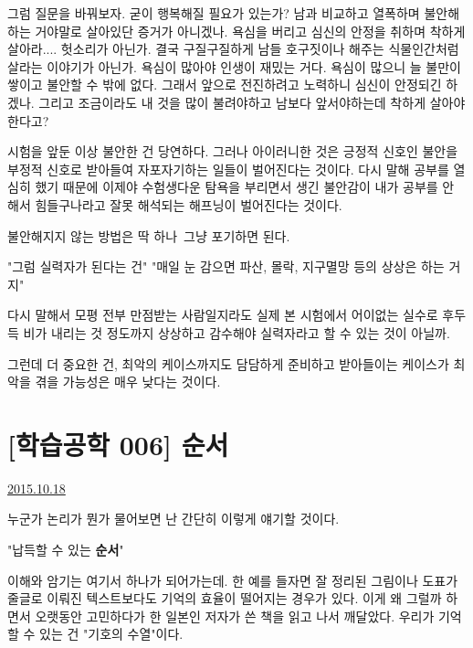 그럼 질문을 바꿔보자. 굳이 행복해질 필요가 있는가?
남과 비교하고 열폭하며 불안해하는 거야말로 살아있단 증거가 아니겠나.
욕심을 버리고 심신의 안정을 취하며 착하게 살아라.... 헛소리가 아닌가.
결국 구질구질하게 남들 호구짓이나 해주는 식물인간처럼 살라는 이야기가 아닌가.
욕심이 많아야 인생이 재밌는 거다. 욕심이 많으니 늘 불만이 쌓이고 불안할 수 밖에 없다.
그래서 앞으로 전진하려고 노력하니 심신이 안정되긴 하겠나.
그리고 조금이라도 내 것을 많이 불려야하고 남보다 앞서야하는데 착하게 살아야한다고?
\vspace{5mm}

시험을 앞둔 이상 불안한 건 당연하다. 그러나 아이러니한 것은
긍정적 신호인 불안을 부정적 신호로 받아들여 자포자기하는 일들이 벌어진다는 것이다.
다시 말해 공부를 열심히 했기 때문에 이제야 수험생다운 탐욕을 부리면서 생긴 불안감이
내가 공부를 안 해서 힘들구나라고 잘못 해석되는 해프닝이 벌어진다는 것이다.
\vspace{5mm}

불안해지지 않는 방법은 딱 하나 그냥 포기하면 된다.
\vspace{5mm}

"그럼 실력자가 된다는 건"
"매일 눈 감으면 파산, 몰락, 지구멸망 등의 상상은 하는 거지"
\vspace{5mm}

다시 말해서 모평 전부 만점받는 사람일지라도
실제 본 시험에서 어이없는 실수로 후두득 비가 내리는 것 정도까지 상상하고 감수해야
실력자라고 할 수 있는 것이 아닐까.
\vspace{5mm}

그런데 더 중요한 건, 최악의 케이스까지도 담담하게 준비하고 받아들이는 케이스가 최악을 겪을 가능성은 매우 낮다는 것이다.
\vspace{5mm}



\section{[학습공학 006] 순서}
\href{https://www.kockoc.com/Apoc/427063}{2015.10.18}

\vspace{5mm}

누군가 논리가 뭔가 물어보면 난 간단히 이렇게 얘기할 것이다.
\vspace{5mm}

"납득할 수 있는 \textbf{순서}"
\vspace{5mm}

이해와 암기는 여기서 하나가 되어가는데.
한 예를 들자면 잘 정리된 그림이나 도표가 줄글로 이뤄진 텍스트보다도 기억의 효율이 떨어지는 경우가 있다.
이게 왜 그럴까 하면서 오랫동안 고민하다가 한 일본인 저자가 쓴 책을 읽고 나서 깨달았다.
우리가 기억할 수 있는 건 "기호의 수열"이다.
\vspace{5mm}

